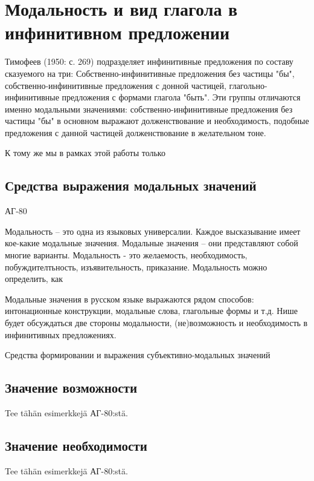 \section{Модальность и вид глагола в инфинитивном предложении}

Тимофеев (1950: с. 269) подразделяет инфинитивные предложения по составу сказуемого на три: Собственно-инфинитивные предложения без частицы "бы", собственно-инфинитивные предложения с донной частицей, глагольно-инфинитивные предложения с формами глагола "быть". Эти группы отличаются именно модальными значениями: собственно-инфинитивные предложения без частицы "бы" в основном выражают долженствование и необходимость, подобные предложения с данной частицей долженствование в желательном тоне.  


К тому же мы в рамках этой работы только 




\subsection{Средства выражения модальных значений}



АГ-80 

Модальность -- это одна из языковых универсалии. Каждое высказывание имеет кое-какие модальные значения. Модальные значения -- они представляют собой многие варианты. Модальность - это желаемость, необходимость, побуждителтьность, изъявительность, приказание. Модальность можно определить, как 

Модальные значения в русском языке выражаются рядом способов: интонационные конструкции, модальные слова, глагольные формы и т.д. Нише будет обсуждаться две стороны модальности, (не)возможность и необходимость в инфинитивных предложениях.

Средства формировании и выражения субъективно-модальных значений


\subsection{Значение возможности}

Tee tähän esimerkkejä АГ-80:stä.

\subsection{Значение необходимости}

Tee tähän esimerkkejä АГ-80:stä.
